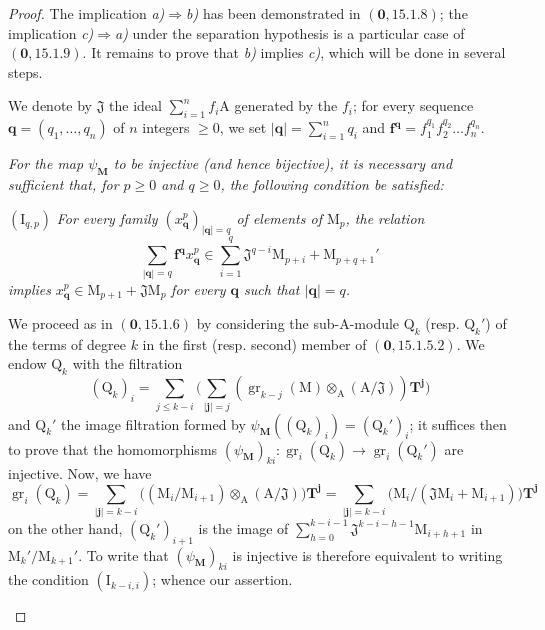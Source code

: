 \begin{proof}
The implication \emph{a)}$\Rightarrow$\emph{b)} has been demonstrated in $(\mathbf{0},15.1.8)$; the implication \emph{c)}$\Rightarrow$\emph{a)} under the separation hypothesis is a particular case of $(\mathbf{0},15.1.9)$. It remains to prove that \emph{b)} implies \emph{c)}, which will be done in several steps.

We denote by $\mathfrak{J}$ the ideal $\sum_{i=1}^{n}f_i\mathrm{A}$ generated by the $f_i$; for every sequence $\mathbf{q}=(q_1,\ldots,q_n)$ of $n$ integers $\geqslant 0$, we set $|\mathbf{q}|=\sum_{i=1}^{n}q_i$ and $\mathbf{f}^\mathbf{q}=f_1^{q_1}f_2^{q_2}\ldots f_n^{q_n}$.

\begin{env}[19.5.5.1]
\label{IV.19.5.5.1}
\emph{For the map $\psi_\mathbf{M}$ to be injective (and hence bijective), it is necessary and sufficient that, for $p\geqslant 0$ and $q\geqslant 0$, the following condition be satisfied:}

$(\mathrm{I}_{q,p})$ \emph{For every family $(x_\mathbf{q}^p)_{|\mathbf{q}|=q}$ of elements of $\mathrm{M}_p$, the relation}
\[
  \textstyle\sum_{|\mathbf{q}|=q}\mathbf{f}^\mathbf{q} x_\mathbf{q}^p\in\textstyle\sum_{i=1}^{q}\mathfrak{J}^{q-i}\mathrm{M}_{p+i}+\mathrm{M}_{p+q+1}'
\]
\emph{implies} $x_\mathbf{q}^p\in\mathrm{M}_{p+1}+\mathfrak{J}\mathrm{M}_p$ \emph{for every $\mathbf{q}$ such that $|\mathbf{q}|=q$.}

We proceed as in $(\mathbf{0},15.1.6)$ by considering the sub-$\mathrm{A}$-module $\mathrm{Q}_k$ (resp. $\mathrm{Q}_k'$) of the terms of degree $k$ in the first (resp. second) member of $(\mathbf{0},15.1.5.2)$. We endow $\mathrm{Q}_k$ with the filtration
\[
  (\mathrm{Q}_k)_i=\textstyle\sum_{j\leqslant k-i}\bigl(\textstyle\sum_{|\mathbf{j}|=j}(\operatorname{gr}_{k-j}(\mathrm{M})\otimes_\mathrm{A}(\mathrm{A}/\mathfrak{J}))\mathbf{T}^\mathbf{j}\bigr)
\]
and $\mathrm{Q}_k'$ the image filtration formed by $\psi_\mathbf{M}((\mathrm{Q}_k)_i)=(\mathrm{Q}_k')_i$; it suffices then to prove that the homomorphisms $(\psi_\mathbf{M})_{ki}:\operatorname{gr}_i(\mathrm{Q}_k)\to\operatorname{gr}_i(\mathrm{Q}_k')$ are injective. Now, we have
\[
  \operatorname{gr}_i(\mathrm{Q}_k)=\textstyle\sum_{|\mathbf{j}|=k-i}\bigl((\mathrm{M}_i/\mathrm{M}_{i+1})\otimes_\mathrm{A}(\mathrm{A}/\mathfrak{J})\bigr)\mathbf{T}^\mathbf{j}
  =\textstyle\sum_{|\mathbf{j}|=k-i}\bigl(\mathrm{M}_i/(\mathfrak{J}\mathrm{M}_i+\mathrm{M}_{i+1})\bigr)\mathbf{T}^\mathbf{j}
\]
on the other hand, $(\mathrm{Q}_k')_{i+1}$ is the image of $\sum_{h=0}^{k-i-1}\mathfrak{J}^{k-i-h-1}\mathrm{M}_{i+h+1}$ in $\mathrm{M}_k'/\mathrm{M}_{k+1}'$. To write that $(\psi_\mathbf{M})_{ki}$ is injective is therefore equivalent to writing the condition $(\mathrm{I}_{k-i,i})$; whence our assertion.
\end{env}


\end{proof}
